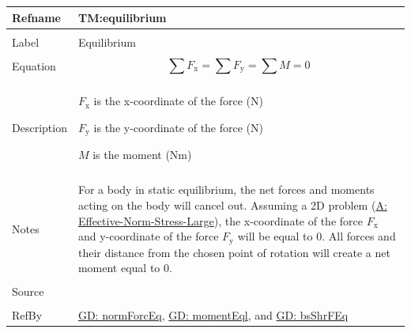 \documentclass[12pt]{article}
\begin{document}
\begin{minipage}{\textwidth}
\begin{tabular}{>{\raggedright}p{}>{\raggedright\arraybackslash}p{}}
\toprule \textbf{Refname} & \textbf{TM:equilibrium}
\label{TM:equilibrium}
\\ \midrule \\
Label & Equilibrium
        
\\ \midrule \\
Equation & \begin{displaymath}
           \displaystyle\sum{{F_{\text{x}}}}=\displaystyle\sum{{F_{\text{y}}}}=\displaystyle\sum{M}=0
           \end{displaymath}
\\ \midrule \\
Description & \begin{symbDescription}
              \item{${F_{\text{x}}}$ is the x-coordinate of the force (N)}
              \item{${F_{\text{y}}}$ is the y-coordinate of the force (N)}
              \item{$M$ is the moment (Nm)}
              \end{symbDescription}
\\ \midrule \\
Notes & For a body in static equilibrium, the net forces and moments acting on the body will cancel out. Assuming a 2D problem (\hyperref[assumpENSL]{A: Effective-Norm-Stress-Large}), the x-coordinate of the force ${F_{\text{x}}}$ and y-coordinate of the force ${F_{\text{y}}}$ will be equal to $0$. All forces and their distance from the chosen point of rotation will create a net moment equal to $0$.
        
\\ \midrule \\
Source & \cite{fredlund1977}
         
\\ \midrule \\
RefBy & \hyperref[GD:normForcEq]{GD: normForcEq}, \hyperref[GD:momentEql]{GD: momentEql}, and \hyperref[GD:bsShrFEq]{GD: bsShrFEq}
        
\\ \bottomrule
\end{tabular}
\end{minipage}
\vspace{\baselineskip}
\noindent
\end{document}
